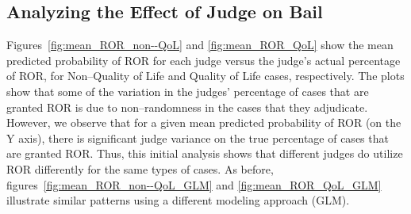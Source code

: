 \subsection{Analyzing the Effect of Judge on Bail}
Figures~\ref{fig:mean_ROR_non--QoL} and
        \ref{fig:mean_ROR_QoL} show
        the mean predicted probability of ROR
        for each judge versus the judge's actual percentage of ROR,
        for Non--Quality of Life and Quality of Life cases,
respectively.
The plots show that some of the variation in
the judges' percentage of cases that are granted ROR is due to
non--randomness in the cases that they adjudicate.
However,
we observe that for a given mean predicted probability of ROR (on the Y axis),
there is significant judge variance on the true percentage of cases that are granted ROR.
Thus,
this initial analysis shows that different judges do utilize ROR differently for the same types of cases.
As before,
figures~\ref{fig:mean_ROR_non--QoL_GLM} and
        \ref{fig:mean_ROR_QoL_GLM} illustrate similar patterns using a different modeling approach (GLM).